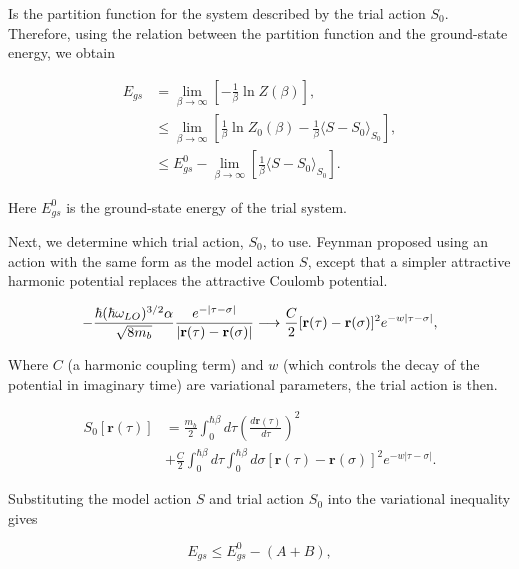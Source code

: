 Is the partition function for the system described by the trial action $S_0$. Therefore, using the relation between the partition function and the ground-state energy, we obtain 

\begin{equation}
\begin{aligned}
    E_{gs} &= \lim_{\beta \to \infty} \left[-\frac{1}{\beta} \ln Z(\beta) \right] , \\
    &\leq \lim_{\beta \to \infty} \left[ \frac{1}{\beta} \ln Z_0(\beta) - \frac{1}{\beta} \langle S-S_0 \rangle_{S_0} \right] , \\ 
    &\leq E^0_{gs} - \lim_{\beta \to \infty} \left[ \frac{1}{\beta} \langle S-S_0 \rangle_{S_0} \right] .
\end{aligned}
\end{equation}

Here $E^0_{gs}$ is the ground-state energy of the trial system. 

Next, we determine which trial action, $S_0$, to use. Feynman proposed using an action with the same form as the model action $S$, except that a simpler attractive harmonic potential replaces the attractive Coulomb potential. 

\begin{equation}
     - \frac{ \hbar (\hbar \omega_{LO})^{3/2} \alpha}{\sqrt{8 m_b}} \frac{e^{-|\tau - \sigma|}}{|\mathbf{r}(\tau) - \mathbf{r}(\sigma)|} \longrightarrow \frac{C}{2} [\vb{r}(\tau) - \vb{r}(\sigma)]^2 e^{-w\abs{\tau - \sigma}},
\end{equation}

Where $C$ (a harmonic coupling term) and $w$ (which controls the decay of the potential in imaginary time) are variational parameters, the trial action is then.

\begin{equation}
\begin{aligned}
        S_0[\mathbf{r}(\tau)] &= \frac{m_b}{2}\int^{\hbar\beta}_0 d\tau \left(\frac{d\mathbf{r}(\tau)}{d\tau}\right)^2\\
        &+ \frac{C}{2} \int^{\hbar\beta}_0 d\tau \int^{\hbar\beta}_0 d\sigma \left[\mathbf{r}(\tau) - \mathbf{r}(\sigma)\right]^2 e^{-w|\tau - \sigma|} .
\label{eqn:athermal_trial_action}
\end{aligned}
\end{equation}

Substituting the model action $S$ and trial action $S_0$ into the variational inequality gives

\begin{equation}
    E_{gs} \leq E_{gs}^0 - (A + B),
\end{equation}

